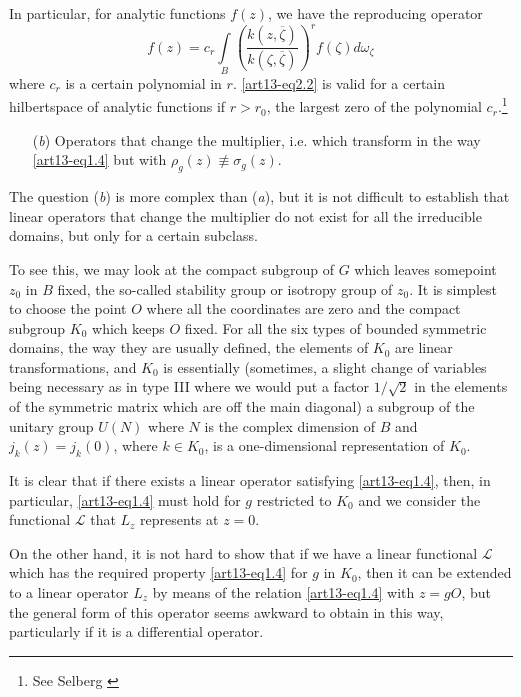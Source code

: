 In particular, for analytic functions $f(z)$, we have the reproducing operator
\begin{equation}
f(z)=c_{r}\int\limits_{B}\left(\frac{k(z,\overline{\zeta})}{k(\zeta,\overline{\zeta})}\right)^{r}f(\zeta)d\omega_{\zeta}\label{art13-eq2.2}
\end{equation}
where $c_{r}$ is a certain polynomial in $r$. \eqref{art13-eq2.2} is valid for a certain hilbert\-space of analytic functions if $r>r_{0}$, the largest zero of the polynomial $c_{r}$.\footnote{See Selberg \cite{art13-key4}} 
\begin{itemize}
\item[({\em b})] Operators that change the multiplier, i.e. which transform in the way \eqref{art13-eq1.4} but with $\rho_{g}(z)\nequiv \sigma_{g}(z)$.
\end{itemize}

The question ({\em b}) is more complex than ({\em a}), but it is not difficult to establish that linear operators that change the multiplier do not exist for all the irreducible domains, but only for a certain subclass.

To see this, we may look at the compact subgroup of $G$ which leaves some\pageoriginale point $z_{0}$ in $B$ fixed, the so-called stability group or isotropy group of $z_{0}$. It is simplest to choose the point $O$ where all the coordinates are zero and the compact subgroup $K_{0}$ which keeps $O$ fixed. For all the six types of bounded symmetric domains, the way they are usually defined, the elements of $K_{0}$ are linear transformations, and $K_{0}$ is essentially (sometimes, a slight change of variables being necessary as in type III where we would put a factor $1/\sqrt{2}$ in the elements of the symmetric matrix which are off the main diagonal) a subgroup of the unitary group $U(N)$ where $N$ is the complex dimension of $B$ and $j_{k}(z)=j_{k}(0)$, where $k\in K_{0}$, is a one-dimensional representation of $K_{0}$.

It is clear that if there exists a linear operator satisfying \eqref{art13-eq1.4}, then, in particular, \eqref{art13-eq1.4} must hold for $g$ restricted to $K_{0}$ and we consider the functional $\mathscr{L}$ that $L_{z}$ represents at $z=0$.

On the other hand, it is not hard to show that if we have a linear functional $\mathscr{L}$ which has the required property \eqref{art13-eq1.4} for $g$ in $K_{0}$, then it can be extended to a linear operator $L_{z}$ by means of the relation \eqref{art13-eq1.4} with $z=gO$, but the general form of this operator seems awkward to obtain in this way, particularly if it is a differential operator.

